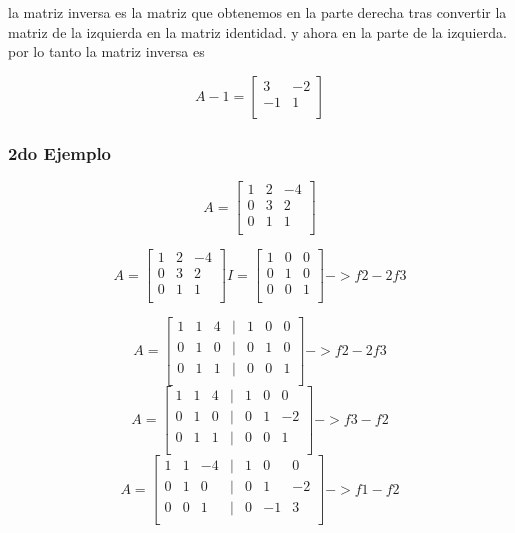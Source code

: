 \documentclass{article}
\begin{document}
la matriz inversa es la matriz que obtenemos en la parte derecha tras convertir la matriz
de la izquierda en la matriz identidad. y ahora en la parte de la izquierda. por lo tanto la matriz inversa es



\[
A-1 =
\begin{bmatrix}
 3 & -2  \\
 -1 & 1  \\
\end{bmatrix}
\]


\subsubsection{2do Ejemplo}

\[
A =
\begin{bmatrix}
 1 & 2 & -4 \\
 0 & 3 & 2 \\
 0 & 1 & 1 \\
\end{bmatrix}
\]

\[
    A =
    \begin{bmatrix}
     1 & 2 & -4 \\
     0 & 3 & 2 \\
     0 & 1 & 1 \\
    \end{bmatrix}
I =
\begin{bmatrix}
 1 & 0 & 0 \\
 0 & 1 & 0 \\
 0 & 0 & 1 \\
\end{bmatrix}
-> f2-2f3
\]

\[
    A =
    \begin{bmatrix}
     1 & 1 & 4 &|& 1 & 0 & 0 \\
     0 & 1 & 0 &|& 0 & 1 & 0 \\
     0 & 1 & 1 &|& 0 & 0 & 1 \\
    \end{bmatrix}
    -> f2-2f3
\]
\[
    A =
    \begin{bmatrix}
     1 & 1 & 4 &| &1 & 0 & 0 \\
     0 & 1 & 0 &| &0 & 1 & -2 \\
     0 & 1 & 1 &| &0 & 0 & 1 \\
    \end{bmatrix}
    -> f3- f2
\]
\[
    A =
    \begin{bmatrix}
     1 & 1 & -4& |& 1 & 0 & 0 \\
     0 & 1 & 0 &| &0 & 1 & -2 \\
     0 & 0 & 1 &| &0 & -1 & 3 \\
    \end{bmatrix}
    -> f1- f2
\]
\end{document}
